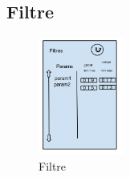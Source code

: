 	\subsection{Filtre}
		\begin{figure}
			\begin{center}
				\includegraphics[width=0.25\textwidth]{figure/filtre.png}
			\end{center}
			\caption{Filtre}
			\label{fig:filtre}
		\end{figure}



